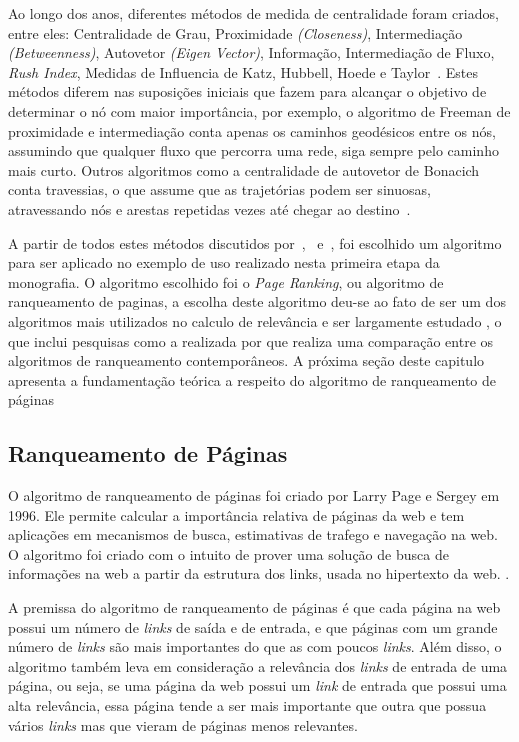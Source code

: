 Ao longo dos anos, diferentes métodos de medida de centralidade foram criados, entre eles: Centralidade de Grau, Proximidade \textit{(Closeness)}, Intermediação \textit{(Betweenness)}, Autovetor \textit{(Eigen Vector)}, Informação, Intermediação de Fluxo, \textit{Rush Index}, Medidas de Influencia de Katz, Hubbell, Hoede e Taylor~\cite{centrality}. Estes métodos diferem nas suposições iniciais que fazem para alcançar o objetivo de determinar o nó com maior importância, por exemplo, o algoritmo de Freeman de proximidade e intermediação conta apenas os caminhos geodésicos entre os nós, assumindo que qualquer fluxo que percorra uma rede, siga sempre pelo caminho mais curto. Outros algoritmos como a centralidade de autovetor de Bonacich conta travessias, o que assume que as trajetórias podem ser sinuosas, atravessando nós e arestas repetidas vezes até chegar ao destino~\cite{Bonacich87}.

A partir de todos estes métodos discutidos por~\cite{ceflow},~\cite{centrality} e~\cite{Bonacich87}, foi escolhido um algoritmo para ser aplicado no exemplo de uso realizado nesta primeira etapa da monografia. O algoritmo escolhido foi o \textit{Page Ranking}, ou algoritmo de ranqueamento de paginas, a escolha deste algoritmo deu-se ao fato de ser um dos algoritmos mais utilizados no calculo de relevância e ser largamente estudado \cite{brin}, o que inclui pesquisas como a realizada por \cite{muppidi} que realiza uma comparação entre os algoritmos de ranqueamento contemporâneos. A próxima seção deste capitulo apresenta a fundamentação teórica a respeito do algoritmo de ranqueamento de páginas

\subsection{Ranqueamento de Páginas}
\label{ref:ran:pag}
O algoritmo de ranqueamento de páginas foi criado por Larry Page e Sergey em 1996. Ele permite calcular a importância relativa de páginas da web e tem aplicações em mecanismos de busca, estimativas de trafego e navegação na web. O algoritmo foi criado com o intuito de prover uma solução de busca de informações na web a partir da estrutura dos links, usada no hipertexto da web. \cite{pageRank}.

A premissa do algoritmo de ranqueamento de páginas é que cada página na web possui um número de \textit{links} de saída e de entrada, e que páginas com um grande número de \textit{links} são mais importantes do que as com poucos \textit{links}. Além disso, o algoritmo também leva em consideração a relevância dos \textit{links} de entrada de uma página, ou seja, se uma página da web possui um \textit{link} de entrada que possui uma alta relevância, essa página tende a ser mais importante que outra que possua vários \textit{links} mas que vieram de páginas menos relevantes.

